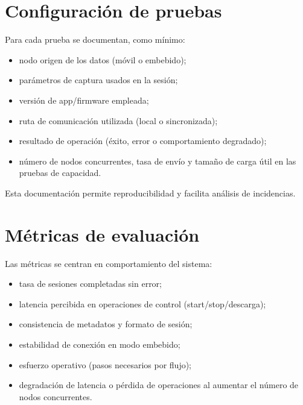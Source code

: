 \label{fig:placeholder-protocolo-experimental}

\section{Configuración de pruebas}

Para cada prueba se documentan, como mínimo:

\begin{itemize}
  \item nodo origen de los datos (móvil o embebido);
  \item parámetros de captura usados en la sesión;
  \item versión de app/firmware empleada;
  \item ruta de comunicación utilizada (local o sincronizada);
  \item resultado de operación (éxito, error o comportamiento degradado);
  \item número de nodos concurrentes, tasa de envío y tamaño de carga útil en las pruebas de capacidad.
\end{itemize}

Esta documentación permite reproducibilidad y facilita análisis de incidencias.

\section{Métricas de evaluación}

Las métricas se centran en comportamiento del sistema:

\begin{itemize}
  \item tasa de sesiones completadas sin error;
  \item latencia percibida en operaciones de control (start/stop/descarga);
  \item consistencia de metadatos y formato de sesión;
  \item estabilidad de conexión en modo embebido;
  \item esfuerzo operativo (pasos necesarios por flujo);
  \item degradación de latencia o pérdida de operaciones al aumentar el número de nodos concurrentes.
\end{itemize}

